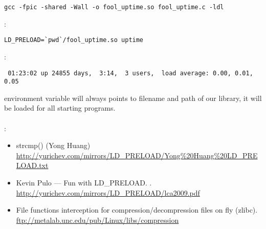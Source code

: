 \begin{lstlisting}
gcc -fpic -shared -Wall -o fool_uptime.so fool_uptime.c -ldl
\end{lstlisting}

:

\begin{lstlisting}
LD_PRELOAD=`pwd`/fool_uptime.so uptime
\end{lstlisting}

:

\begin{lstlisting}
 01:23:02 up 24855 days,  3:14,  3 users,  load average: 0.00, 0.01, 0.05
\end{lstlisting}

  
{environment variable will always points to filename and path of our library, it will be loaded
for all starting programs.} \\
\\
:

\begin{itemize}

\item
{} strcmp() (Yong Huang) 
\url{http://yurichev.com/mirrors/LD\_PRELOAD/Yong\%20Huang\%20LD\_PRELOAD.txt}

\item
Kevin Pulo --- Fun with LD\_PRELOAD. .
\url{http://yurichev.com/mirrors/LD_PRELOAD/lca2009.pdf}

\item
{}
{File functions interception for compression/decompression files on fly} (zlibc). \url{ftp://metalab.unc.edu/pub/Linux/libs/compression}

\end{itemize}
